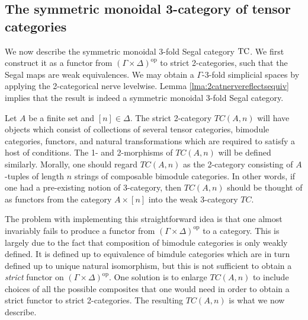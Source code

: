 \documentclass{amsart}
\begin{document}




\subsection{The symmetric monoidal 3-category of tensor categories} \label{sec-tc-threecat}


We now describe the symmetric monoidal 3-fold Segal category $\mathrm{TC}$. We first construct it as a functor from $(\Gamma \times \Delta)^\textrm{op}$ to strict 2-categories, such that the Segal maps are weak equivalences. We may obtain a $\Gamma$-3-fold simplicial spaces by applying the 2-categorical nerve levelwise. Lemma \ref{lma:2catnervereflectsequiv} implies that the result is indeed a symmetric monoidal 3-fold Segal category. 

Let $A$ be a finite set and $[n]\in \Delta$. The strict 2-category $TC(A,n)$ will have objects which consist of collections of several tensor categories, bimodule categories, functors, and natural transformations which are required to satisfy a host of conditions. The 1- and 2-morphisms of $TC(A,n)$ will be defined similarly. Morally, one should regard $TC(A,n)$ as the 2-category consisting of $A$-tuples of length $n$ strings of composable bimodule categories. In other words, if one had a pre-existing notion of 3-category, then $TC(A,n)$ should be thought of as functors from the category $A \times [n]$ into the weak 3-category $TC$. 

The problem with implementing this straightforward idea is that one almost invariably fails to produce a functor from $(\Gamma \times \Delta)^\textrm{op}$ to a category. This is largely due to the fact that  composition of bimodule categories is only weakly defined. It is defined up to equivalence of bimdule categories which are in turn defined up to unique natural isomorphism, but this is not sufficient to obtain a {\em strict} functor on $(\Gamma \times \Delta)^\textrm{op}$. One solution is to enlarge $TC(A,n)$ to include choices of all the possible composites that one would need in order to obtain a strict functor to strict 2-categories. The resulting $TC(A,n)$ is what we now describe.
\end{document}

